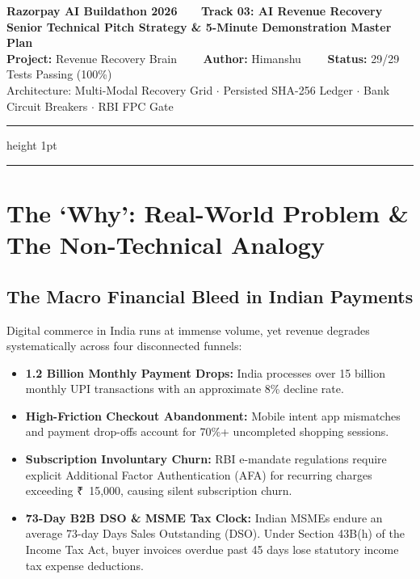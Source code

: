 \documentclass[11pt, a4paper]{article}
\newcommand{\INR}{{\rupeefont ₹}}
\begin{document}
\begin{center}
  {\LARGE\bfseries\color{razorblue} Razorpay AI Buildathon 2026 \ \textbar\ \ Track 03: AI Revenue Recovery}\\[6pt]
  {\Large\bfseries\color{primaryblue} Senior Technical Pitch Strategy \& 5-Minute Demonstration Master Plan}\\[8pt]
  {\normalsize\textbf{Project:} Revenue Recovery Brain \ \ \textbar\ \ \textbf{Author:} Himanshu \ \ \textbar\ \ \textbf{Status:} 29/29 Tests Passing (100\%)}\\[2pt]
  {\footnotesize\color{gray} Architecture: Multi-Modal Recovery Grid $\cdot$ Persisted SHA-256 Ledger $\cdot$ Bank Circuit Breakers $\cdot$ RBI FPC Gate}
\end{center}
\vspace{-4pt}
\hrule height 1pt
\vspace{10pt}

\tableofcontents
\vspace{12pt}
\hrule
\vspace{14pt}

\section{The `Why': Real-World Problem \& The Non-Technical Analogy}

\subsection{The Macro Financial Bleed in Indian Payments}
Digital commerce in India runs at immense volume, yet revenue degrades systematically across four disconnected funnels:
\begin{itemize}[leftmargin=1.5em, itemsep=2pt]
  \item \textbf{1.2 Billion Monthly Payment Drops:} India processes over 15 billion monthly UPI transactions with an approximate 8\% decline rate.
  \item \textbf{High-Friction Checkout Abandonment:} Mobile intent app mismatches and payment drop-offs account for 70\%+ uncompleted shopping sessions.
  \item \textbf{Subscription Involuntary Churn:} RBI e-mandate regulations require explicit Additional Factor Authentication (AFA) for recurring charges exceeding \INR~15,000, causing silent subscription churn.
  \item \textbf{73-Day B2B DSO \& MSME Tax Clock:} Indian MSMEs endure an average 73-day Days Sales Outstanding (DSO). Under Section 43B(h) of the Income Tax Act, buyer invoices overdue past 45 days lose statutory income tax expense deductions.
\end{itemize}
\end{document}
